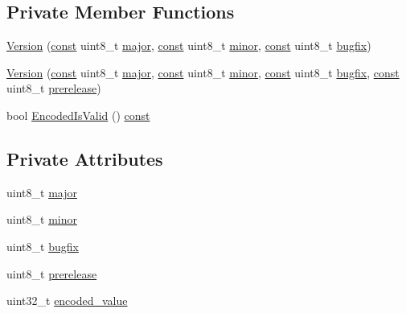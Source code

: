 \subsection*{Private Member Functions}
\begin{DoxyCompactItemize}
\item 
\mbox{\hyperlink{classlucene_1_1core_1_1util_1_1Version_aab6be2fea4aac2881ae89ce58de8adcf}{Version}} (\mbox{\hyperlink{ZlibCrc32_8h_a2c212835823e3c54a8ab6d95c652660e}{const}} uint8\+\_\+t \mbox{\hyperlink{classlucene_1_1core_1_1util_1_1Version_a11869713f07c51b2d75088bb352a564a}{major}}, \mbox{\hyperlink{ZlibCrc32_8h_a2c212835823e3c54a8ab6d95c652660e}{const}} uint8\+\_\+t \mbox{\hyperlink{classlucene_1_1core_1_1util_1_1Version_a87453ae1f193926a68af197d41cceee9}{minor}}, \mbox{\hyperlink{ZlibCrc32_8h_a2c212835823e3c54a8ab6d95c652660e}{const}} uint8\+\_\+t \mbox{\hyperlink{classlucene_1_1core_1_1util_1_1Version_ac787e4c7011225c89c1f677155d162f8}{bugfix}})
\item 
\mbox{\hyperlink{classlucene_1_1core_1_1util_1_1Version_a66271931b8d12d78ca35ec79a559a86e}{Version}} (\mbox{\hyperlink{ZlibCrc32_8h_a2c212835823e3c54a8ab6d95c652660e}{const}} uint8\+\_\+t \mbox{\hyperlink{classlucene_1_1core_1_1util_1_1Version_a11869713f07c51b2d75088bb352a564a}{major}}, \mbox{\hyperlink{ZlibCrc32_8h_a2c212835823e3c54a8ab6d95c652660e}{const}} uint8\+\_\+t \mbox{\hyperlink{classlucene_1_1core_1_1util_1_1Version_a87453ae1f193926a68af197d41cceee9}{minor}}, \mbox{\hyperlink{ZlibCrc32_8h_a2c212835823e3c54a8ab6d95c652660e}{const}} uint8\+\_\+t \mbox{\hyperlink{classlucene_1_1core_1_1util_1_1Version_ac787e4c7011225c89c1f677155d162f8}{bugfix}}, \mbox{\hyperlink{ZlibCrc32_8h_a2c212835823e3c54a8ab6d95c652660e}{const}} uint8\+\_\+t \mbox{\hyperlink{classlucene_1_1core_1_1util_1_1Version_a4c08e618e67e80087841a83cbf922fdc}{prerelease}})
\item 
bool \mbox{\hyperlink{classlucene_1_1core_1_1util_1_1Version_ac27b940b6b38b0a065654ae2f2d82727}{Encoded\+Is\+Valid}} () \mbox{\hyperlink{ZlibCrc32_8h_a2c212835823e3c54a8ab6d95c652660e}{const}}
\end{DoxyCompactItemize}
\subsection*{Private Attributes}
\begin{DoxyCompactItemize}
\item 
uint8\+\_\+t \mbox{\hyperlink{classlucene_1_1core_1_1util_1_1Version_a11869713f07c51b2d75088bb352a564a}{major}}
\item 
uint8\+\_\+t \mbox{\hyperlink{classlucene_1_1core_1_1util_1_1Version_a87453ae1f193926a68af197d41cceee9}{minor}}
\item 
uint8\+\_\+t \mbox{\hyperlink{classlucene_1_1core_1_1util_1_1Version_ac787e4c7011225c89c1f677155d162f8}{bugfix}}
\item 
uint8\+\_\+t \mbox{\hyperlink{classlucene_1_1core_1_1util_1_1Version_a4c08e618e67e80087841a83cbf922fdc}{prerelease}}
\item 
uint32\+\_\+t \mbox{\hyperlink{classlucene_1_1core_1_1util_1_1Version_afa0268093d2c0ef09466e986506e5bd8}{encoded\+\_\+value}}
\end{DoxyCompactItemize}


